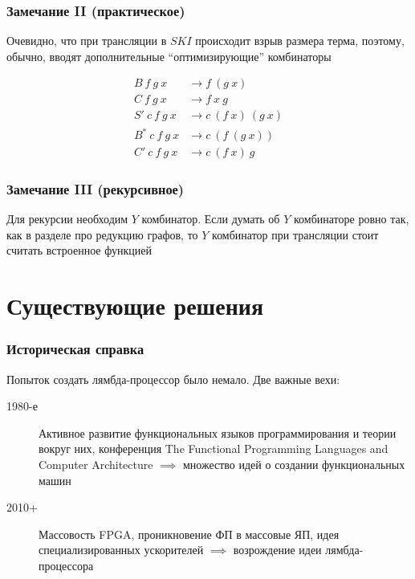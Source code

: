 \begin{frame}
    \frametitle{Замечание II (практическое)}

    Очевидно, что при трансляции в $SKI$ происходит взрыв размера терма, поэтому, обычно, вводят дополнительные \enquote{оптимизирующие} комбинаторы

    \begin{align*}
        B\ f\ g\ x      & \rightarrow f\ (g\ x)         \\
        C\ f\ g\ x      & \rightarrow f\ x\ g           \\
        S'\ c\ f\ g\ x  & \rightarrow c\ (f\ x)\ (g\ x) \\
        B^*\ c\ f\ g\ x & \rightarrow c\ (f\ (g\ x))    \\
        C'\ c\ f\ g\ x  & \rightarrow c\ (f\ x)\ g
    \end{align*}

\end{frame}

\begin{frame}
    \frametitle{Замечание III (рекурсивное)}

    Для рекурсии необходим $Y$ комбинатор.
    Если думать об $Y$ комбинаторе ровно так, как в разделе про редукцию графов, то $Y$ комбинатор при трансляции стоит считать встроенное функцией

\end{frame}

\section{Существующие решения}
\begin{frame}
    \frametitle{Историческая справка}
    Попыток создать лямбда-процессор было немало.
    Две важные вехи:
    \begin{description}
        \item[1980-е] Активное развитие функциональных языков программирования и теории вокруг них, конференция The Functional Programming Languages and Computer Architecture $\implies$ множество идей о создании функциональных машин
        \item[2010+] Массовость FPGA, проникновение ФП в массовые ЯП, идея специализированных ускорителей $\implies$ возрождение идеи лямбда-процессора
    \end{description}

\end{frame}

